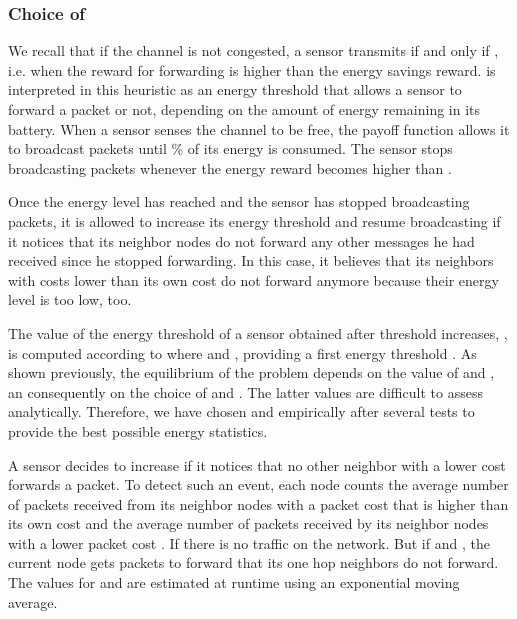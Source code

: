 \documentclass[journal, peerreview, onecolumn, draftcls]{IEEEtran}
\begin{document}
\subsubsection{Choice of }
We recall that if the channel is not congested, a sensor transmits if and only if , i.e. when the reward for forwarding is higher than the energy savings reward.  is interpreted in this heuristic as an energy threshold that allows a sensor to forward a packet or not, depending on the amount of energy remaining in its battery.
When a sensor senses the channel to be free, the payoff function allows it to broadcast packets until  \% of its energy is consumed. The sensor stops broadcasting packets whenever the energy reward becomes higher than .

Once the energy level has reached  and the sensor has stopped broadcasting packets, it is allowed to increase its energy threshold  and resume broadcasting if it notices that its neighbor nodes do not forward any other messages he had received since he stopped forwarding. In this case, it believes that its neighbors with costs lower than its own cost do not forward anymore because their energy level is too low, too.

The value of the energy threshold of a sensor  obtained after  threshold increases, , is computed according to  where  and , providing a first energy threshold . As shown previously, the equilibrium of the problem depends on the value of  and , an consequently on the choice of  and . The latter values are difficult to assess analytically. Therefore, we have chosen  and  empirically after several tests to provide the best possible energy statistics.

A sensor decides to increase  if it notices that no other neighbor with a lower cost forwards a packet. To detect such an event, each node counts the average number of packets  received from its neighbor nodes with a packet cost  that is higher than its own cost  and the average number of packets  received by its neighbor nodes with a lower packet cost . If  there is no traffic on the network. But if  and , the current node gets packets to forward that its one hop neighbors do not forward.
The values for  and  are estimated at runtime using an exponential moving average.
\end{document}
